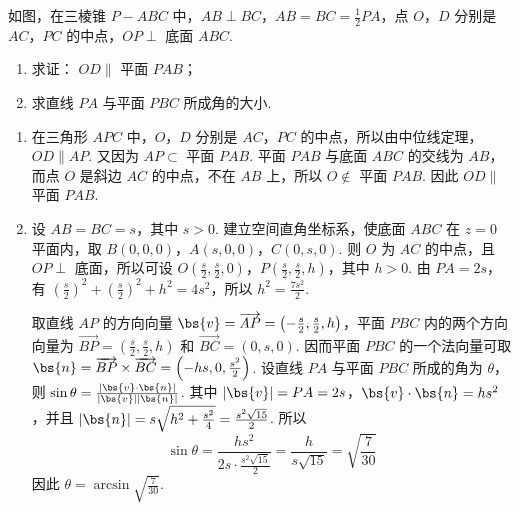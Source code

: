 \begin{problem}
如图，在三棱锥 \(P - ABC\) 中，\(AB \perp BC\)，\(AB = BC = \frac{1}{2} PA\)，点 \(O\)，\(D\) 分别是 \(AC\)，\(PC\) 的中点，\(OP \perp\) 底面 \(ABC\).
\begin{enumerate}
\item 求证： \( OD \parallel \) 平面 \(PAB\)；
\item 求直线 \(PA\) 与平面 \(PBC\) 所成角的大小.
\end{enumerate}


\begin{solution}
\begin{enumerate}
\item 在三角形 \(APC\) 中，\(O\)，\(D\) 分别是 \(AC\)，\(PC\) 的中点，所以由中位线定理，
\(OD\parallel AP\). 又因为 \(AP\subset\) 平面 \(PAB\). 平面 \(PAB\) 与底面 \(ABC\) 的交线为 \(AB\)，而点 \(O\) 是斜边 \(AC\) 的中点，不在 \(AB\) 上，所以 \(O\notin\) 平面 \(PAB\). 因此 \(OD\parallel\) 平面 \(PAB\).

\item 设 \(AB=BC=s\)，其中 \(s>0\). 建立空间直角坐标系，使底面 \(ABC\) 在 \(z=0\) 平面内，取 \(B(0,0,0)\)，\(A(s,0,0)\)，\(C(0,s,0)\). 则 \(O\) 为 \(AC\) 的中点，且 \(OP\perp\) 底面，所以可设 \(O\left(\frac{s}{2},\frac{s}{2},0\right)\)，\(P\left(\frac{s}{2},\frac{s}{2},h\right)\)，其中 \(h>0\). 由 \(PA=2s\)，有 \(\left(\frac{s}{2}\right)^2+\left(\frac{s}{2}\right)^2+h^2=4s^2\)，所以 \(h^2=\frac{7s^2}{2}\).

取直线 \(AP\) 的方向向量 \(\bs{v}=\overrightarrow{AP}=\left(-\frac{s}{2},\frac{s}{2},h\right)\)，平面 \(PBC\) 内的两个方向向量为 \(\overrightarrow{BP}=\left(\frac{s}{2},\frac{s}{2},h\right)\) 和 \(\overrightarrow{BC}=(0,s,0)\). 因而平面 \(PBC\) 的一个法向量可取 \(\bs{n}=\overrightarrow{BP}\times\overrightarrow{BC}=\left(-hs,0,\frac{s^2}{2}\right)\). 设直线 \(PA\) 与平面 \(PBC\) 所成的角为 \(\theta\)，则 \(\sin\theta=\frac{\left|\bs{v}\cdot\bs{n}\right|}{\left|\bs{v}\right|\left|\bs{n}\right|}\). 其中 \(\left|\bs{v}\right|=PA=2s\)，\(\bs{v}\cdot\bs{n}=hs^2\)，并且 \(\left|\bs{n}\right|=s\sqrt{h^2+\frac{s^2}{4}}=\frac{s^2\sqrt{15}}{2}\). 所以
\[
\sin\theta=\frac{hs^2}{2s\cdot\frac{s^2\sqrt{15}}{2}}=\frac{h}{s\sqrt{15}}=\sqrt{\frac{7}{30}}
\]
因此 \(\theta=\arcsin\sqrt{\frac{7}{30}}\).
\end{enumerate}
\end{solution}
\end{problem}

